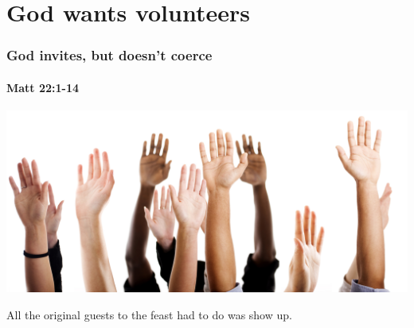 \section{God wants volunteers}

\begin{frame}
\frametitle{God invites, but doesn't coerce}
\framesubtitle{Matt 22:1-14}
\begin{center}
\includegraphics[width=\textwidth]{figures/volunteer.jpg}
\end{center}
All the original guests to the feast had to do was show up.

\end{frame}

